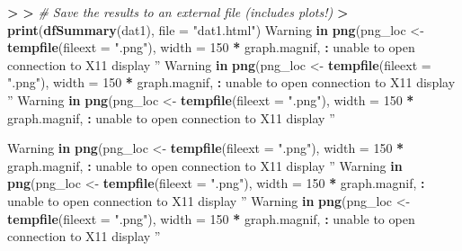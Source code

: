 \documentclass[
]{book}
\newenvironment{Shaded}{\begin{snugshade}}{\end{snugshade}}
\newcommand{\CommentTok}[1]{\textcolor[rgb]{0.56,0.35,0.01}{\textit{#1}}}
\newcommand{\ControlFlowTok}[1]{\textcolor[rgb]{0.13,0.29,0.53}{\textbf{#1}}}
\newcommand{\DataTypeTok}[1]{\textcolor[rgb]{0.13,0.29,0.53}{#1}}
\newcommand{\DecValTok}[1]{\textcolor[rgb]{0.00,0.00,0.81}{#1}}
\newcommand{\ErrorTok}[1]{\textcolor[rgb]{0.64,0.00,0.00}{\textbf{#1}}}
\newcommand{\KeywordTok}[1]{\textcolor[rgb]{0.13,0.29,0.53}{\textbf{#1}}}
\newcommand{\NormalTok}[1]{#1}
\newcommand{\OperatorTok}[1]{\textcolor[rgb]{0.81,0.36,0.00}{\textbf{#1}}}
\newcommand{\StringTok}[1]{\textcolor[rgb]{0.31,0.60,0.02}{#1}}
\begin{document}
\begin{Shaded}
\begin{Highlighting}[]
\OperatorTok{>}\StringTok{ }
\ErrorTok{>}\StringTok{ }\CommentTok{# Save the results to an external file (includes plots!)}
\ErrorTok{>}\StringTok{ }\KeywordTok{print}\NormalTok{(}\KeywordTok{dfSummary}\NormalTok{(dat1), }\DataTypeTok{file =} \StringTok{"dat1.html"}\NormalTok{)}
\NormalTok{Warning }\ControlFlowTok{in} \KeywordTok{png}\NormalTok{(png_loc <-}\StringTok{ }\KeywordTok{tempfile}\NormalTok{(}\DataTypeTok{fileext =} \StringTok{".png"}\NormalTok{), }\DataTypeTok{width =} \DecValTok{150} \OperatorTok{*}
\NormalTok{graph.magnif, }\OperatorTok{:}\StringTok{ }\NormalTok{unable to open connection to X11 display }\StringTok{''}
\NormalTok{Warning }\ControlFlowTok{in} \KeywordTok{png}\NormalTok{(png_loc <-}\StringTok{ }\KeywordTok{tempfile}\NormalTok{(}\DataTypeTok{fileext =} \StringTok{".png"}\NormalTok{), }\DataTypeTok{width =} \DecValTok{150} \OperatorTok{*}
\NormalTok{graph.magnif, }\OperatorTok{:}\StringTok{ }\NormalTok{unable to open connection to X11 display }\StringTok{''}
\NormalTok{Warning }\ControlFlowTok{in} \KeywordTok{png}\NormalTok{(png_loc <-}\StringTok{ }\KeywordTok{tempfile}\NormalTok{(}\DataTypeTok{fileext =} \StringTok{".png"}\NormalTok{), }\DataTypeTok{width =} \DecValTok{150} \OperatorTok{*}
\NormalTok{graph.magnif, }\OperatorTok{:}\StringTok{ }\NormalTok{unable to open connection to X11 display }\StringTok{''}

\NormalTok{Warning }\ControlFlowTok{in} \KeywordTok{png}\NormalTok{(png_loc <-}\StringTok{ }\KeywordTok{tempfile}\NormalTok{(}\DataTypeTok{fileext =} \StringTok{".png"}\NormalTok{), }\DataTypeTok{width =} \DecValTok{150} \OperatorTok{*}
\NormalTok{graph.magnif, }\OperatorTok{:}\StringTok{ }\NormalTok{unable to open connection to X11 display }\StringTok{''}
\NormalTok{Warning }\ControlFlowTok{in} \KeywordTok{png}\NormalTok{(png_loc <-}\StringTok{ }\KeywordTok{tempfile}\NormalTok{(}\DataTypeTok{fileext =} \StringTok{".png"}\NormalTok{), }\DataTypeTok{width =} \DecValTok{150} \OperatorTok{*}
\NormalTok{graph.magnif, }\OperatorTok{:}\StringTok{ }\NormalTok{unable to open connection to X11 display }\StringTok{''}
\NormalTok{Warning }\ControlFlowTok{in} \KeywordTok{png}\NormalTok{(png_loc <-}\StringTok{ }\KeywordTok{tempfile}\NormalTok{(}\DataTypeTok{fileext =} \StringTok{".png"}\NormalTok{), }\DataTypeTok{width =} \DecValTok{150} \OperatorTok{*}
\NormalTok{graph.magnif, }\OperatorTok{:}\StringTok{ }\NormalTok{unable to open connection to X11 display }\StringTok{''}


\end{Highlighting}
\end{Shaded}
\end{document}
